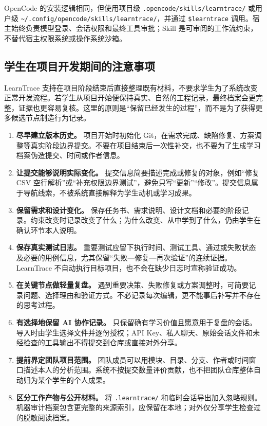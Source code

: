 \documentclass[UTF8,a4paper,12pt]{ctexart}
\begin{document}
OpenCode 的安装逻辑相同，但使用项目级 \texttt{.opencode/skills/learntrace/} 或用户级 \texttt{\textasciitilde/.config/opencode/skills/learntrace/}，并通过 \texttt{\$learntrace} 调用。宿主始终负责模型登录、会话权限和最终工具审批；Skill 是可审阅的工作流约束，不替代宿主权限系统或操作系统沙箱。

\subsection{学生在项目开发期间的注意事项}

LearnTrace 支持在项目阶段结束后直接整理既有材料，不要求学生为了系统改变正常开发流程。若学生从项目开始便保持真实、自然的工程记录，最终档案会更完整，证据也更容易复核。这里的原则是“保留已经发生的过程”，而不是为了获得更多候选节点制造行为记录。

\begin{enumerate}
  \item \textbf{尽早建立版本历史。} 项目开始时初始化 Git，在需求完成、缺陷修复、方案调整等真实阶段边界提交。不要在项目结束后一次性补交，也不要为了生成学习档案伪造提交、时间或作者信息。
  \item \textbf{让提交能够说明实际变化。} 提交信息简要描述完成或修复的对象，例如“修复 CSV 空行解析”或“补充权限边界测试”，避免只写“更新”“修改”。提交信息属于导航线索，不被系统直接解释为学生动机或学习成果。
  \item \textbf{保留需求和设计变化。} 保存任务书、需求说明、设计文档和必要的阶段记录。约束改变时记录改变了什么；为什么改变、从中学到了什么，仍由学生在确认环节本人说明。
  \item \textbf{保存真实测试日志。} 重要测试应留下执行时间、测试工具、通过或失败状态及必要的用例信息，尤其保留“失败—修复—再次验证”的连续证据。LearnTrace 不自动执行目标项目，也不会在缺少日志时宣称验证成功。
  \item \textbf{在关键节点做轻量复盘。} 遇到重要决策、失败修复或方案调整时，可简要记录问题、选择理由和验证方式。不必记录每次编辑，更不能事后补写并不存在的思考过程。
  \item \textbf{有选择地保留 AI 协作记录。} 只保留确有学习价值且愿意用于复盘的会话。导入时由学生选择文件并逐份授权；API Key、私人聊天、原始会话文件和未经检查的工具输出不得提交到仓库或直接对外分享。
  \item \textbf{提前界定团队项目范围。} 团队成员可以用模块、目录、分支、作者或时间窗口描述本人的分析范围。系统不按提交数量评价贡献，也不把团队仓库整体自动归为某个学生的个人成果。
  \item \textbf{区分工作产物与公开材料。} 将 \texttt{.learntrace/} 和临时会话导出加入忽略规则。机器审计档案包含更完整的来源索引，应保留在本地；对外仅分享学生检查过的脱敏阅读档案。
\end{enumerate}
\end{document}
